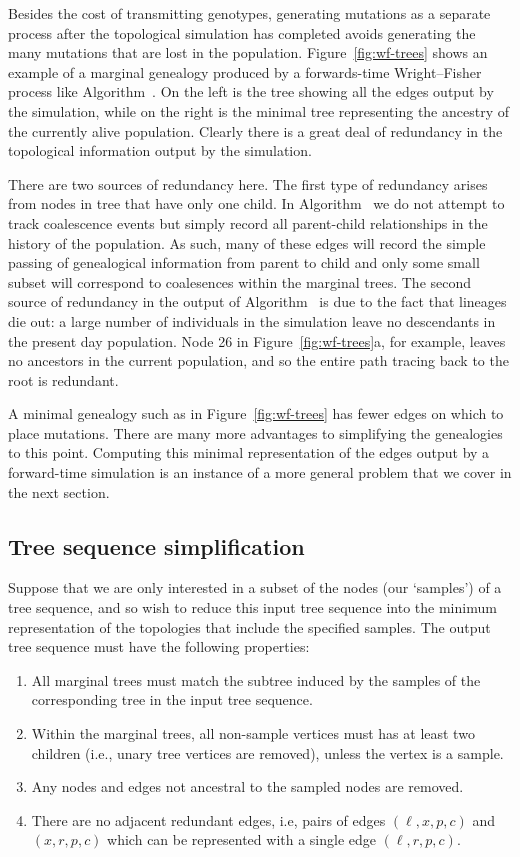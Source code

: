 \documentclass{article}
\begin{document}
Besides the cost of transmitting genotypes,
generating mutations as a separate process after the topological simulation has completed
avoids generating the many mutations that are lost in the population.
Figure~\ref{fig:wf-trees} shows
an example of a marginal genealogy produced by a forwards-time Wright--Fisher
process like Algorithm~.
On the left is the tree showing all the edges output by the simulation,
while on the right
is the minimal tree representing the ancestry of the currently alive
population. Clearly there is a great deal of redundancy in the topological
information output by the simulation.

There are two sources of redundancy here. The first type of redundancy arises
from nodes in tree that have only one child. In Algorithm~ we do
not attempt to track coalescence events but simply record all parent-child
relationships in the history of the population. As such, many of these edges
will record the simple passing of genealogical information from parent to child
and only some small subset will correspond to coalesences within the marginal
trees. The second source of redundancy in the output of Algorithm~
is due to the fact that lineages die out: a large number of
individuals in the simulation leave no descendants in the present day population.
Node 26 in Figure~\ref{fig:wf-trees}a, for example, leaves no
ancestors in the current population, and so the entire path tracing back to
the root is redundant.

A minimal genealogy such as in Figure~\ref{fig:wf-trees}
has fewer edges on which to place mutations.
There are many more advantages to simplifying the genealogies to this point.
Computing this minimal representation of the
edges output by a forward-time simulation is an instance of a more
general problem that we cover in the next section.


\subsection*{Tree sequence simplification}

Suppose that we are only interested in a subset of the nodes (our `samples')
of a tree sequence,
and so wish to reduce this input tree sequence
into the minimum representation of the topologies that include the specified
samples. The output tree sequence must have the following properties:
\begin{enumerate}
\item All marginal trees must match the subtree induced by the samples of the corresponding tree in the input tree sequence.
\item Within the marginal trees, all non-sample vertices must has at least
two children (i.e., unary tree vertices are removed), unless the vertex is a sample.
\item Any nodes and edges not ancestral to the sampled nodes are removed.
\item There are no adjacent redundant edges, i.e, pairs of edges $(\ell, x, p,
c)$ and $(x, r, p, c)$ which can be represented with a single edge
$(\ell, r, p, c)$.
\end{enumerate}
\end{document}
